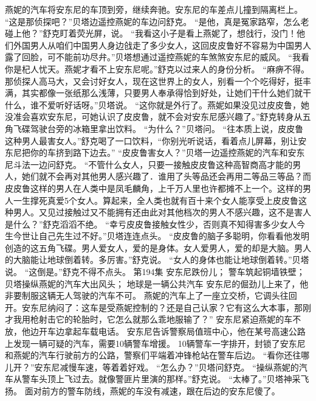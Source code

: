 \documentclass[a4paper,12pt,UTF8,twoside]{ctexbook}
\begin{document}
        燕妮的汽车将安东尼的车顶到旁，继续奔驰。安东尼的车差点儿撞到隔离栏上。 
        “这是那侦探吧？”贝塔边遥控燕妮的车边问舒克。 
        “是他，真是冤家路窄，怎么老碰上他？”舒克盯着荧光屏，说。 
        “我看这小子是看上燕妮了，想戗行，没门！他们外国男人从咱们中国男人身边戗走了多少女人，这回皮皮鲁好不容易为中国男人露了回脸，可不能前功尽弁。”贝塔想通过遥控燕妮的车煞煞安东尼的威风。 
        “我看你是杞人忧天。燕妮才看不上安东尼呢。”舒克以过来人的身份分析。 
        “麻痹不得。那侦探人高马大，又会讨好女人，现在这世界上的女人，别看一个个吃得好，挺丰满，其实都像一张纸那么浅薄，只要男人奉承得恰到好处，让她们干什么她们就干什么，谁不爱听好话呀。”贝塔说。 
        “这你就是外行了。燕妮如果没见过皮皮鲁，她没准会喜欢安东尼，可她认识了皮皮鲁，就不会对安东尼感兴趣了。”舒克转身从五角飞碟驾驶台旁的冰箱里拿出饮料。 
        “为什么？”贝塔问。 
        “往本质上说，皮皮鲁这种男人最害女人。”舒克喝了一口饮料，“你别光听说话，看着点儿屏幕，别让安东尼把你的车挤到路下边去。” 
        “皮皮鲁害女人？”贝塔一边遥控燕妮的汽车和安东尼斗法一边问舒克。 
        “不管什么女人，只要一接触皮皮鲁这种高智商高才能的男人，她们就不会再对其他男人感兴趣了．谁用了头等品还会再用二等品三等品？而皮皮鲁这样的男人在人类中是凤毛麟角，上千万人里也许都摊不上一个。这样的男人一生撑死真爱5个女人。算起来，全人类也就有百十来个女人能享受上皮皮鲁这种男人。又见过接触过又不能拥有还由此对其他档次的男人不感兴趣，这不是害人是什么？”舒克滔滔不绝。 
        “幸亏皮皮鲁接触女性少，否则真不知得害多少女人今生今世让自己先生过不好。”贝塔连连点头。 
        “皮皮鲁的脑子多聪明，你看看他发明创造的这五角飞碟。男人爱女人，爱的是身体。女人爱男人，爱的却是大脑。男人的大脑能让地球倒着转。多厉害。”舒克说。 
        “女人的身体也能让地球倒着转。”贝塔说。 
        “这倒是。”舒克不得不点头。   第194集 
        安东尼跌份儿； 
        警车筑起铜墙铁壁； 
        贝塔操纵燕妮的汽车大出风头； 
        地球是一辆公共汽车   
        安东尼的倔劲儿上来了，他非要制服这辆无人驾驶的汽车不可。 
        燕妮的汽车上了一座立交桥，它调头往回开。安东尼纳闷了：这车是受燕妮控制的？还是自己认家？它有这么大本事，那刚才我用枪射击它的轮胎时，它怎么就那么乖地服输了？” 
        安东尼紧迫燕妮的车不放，他边开车边拿起车载电话。 
        安东尼告诉警察局值班中心，他在某号高速公路上发现一辆可疑的汽车，需要10辆警车增援。 
        10辆警车一字排开，封锁了安东尼和燕妮的汽车行驶前方的公路，警察们平端着冲锋枪站在警车后边。 
        “看你还往哪儿开？”安东尼减慢车速，等着着好戏。 
        “怎么办？”贝塔问舒克。 
        “操纵燕妮的汽车从警车头顶上飞过去。就像警匪片里演的那样。”舒克说。 
        “太棒了。”贝塔神采飞扬。 
        面对前方的警车防线，燕妮的车没有减速，跟在后边的安东尼傻了。 
\end{document}
